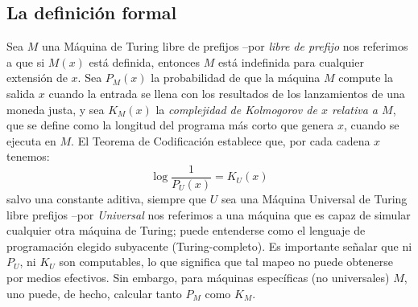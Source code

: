 \subsection{La definición formal}


Sea $M$ una Máquina de Turing libre de prefijos --por {\em libre de prefijo} nos referimos a que si $M(x)$ está definida, entonces $M$ está indefinida para cualquier extensión de $x$. Sea $P_M(x)$ la probabilidad de que la máquina $M$ compute la salida $x$ cuando la entrada se llena con los resultados de los lanzamientos de una moneda justa, y sea $K_M(x)$ la {\em complejidad de Kolmogorov de $x$ relativa a $M$}, que se define como la longitud del programa más corto que genera $x$, cuando se ejecuta en $M$. El Teorema de Codificación establece que, por cada cadena $x$ tenemos:
%
\begin{equation*}
\label{eqF}
\log \frac{1}{P_U(x)} = K_U(x)
\end{equation*}
%
salvo una constante aditiva, siempre que $U$ sea una Máquina Universal de Turing libre prefijos --por {\em Universal} nos referimos a una máquina que es capaz de simular cualquier otra máquina de Turing; puede entenderse como el lenguaje de programación elegido subyacente (Turing-completo). Es importante señalar que ni $P_U$, ni $K_U$ son computables, lo que significa que tal mapeo no puede obtenerse por medios efectivos. Sin embargo, para máquinas específicas (no universales) $M$, uno puede, de hecho, calcular tanto $P_M$ como $K_M$.

